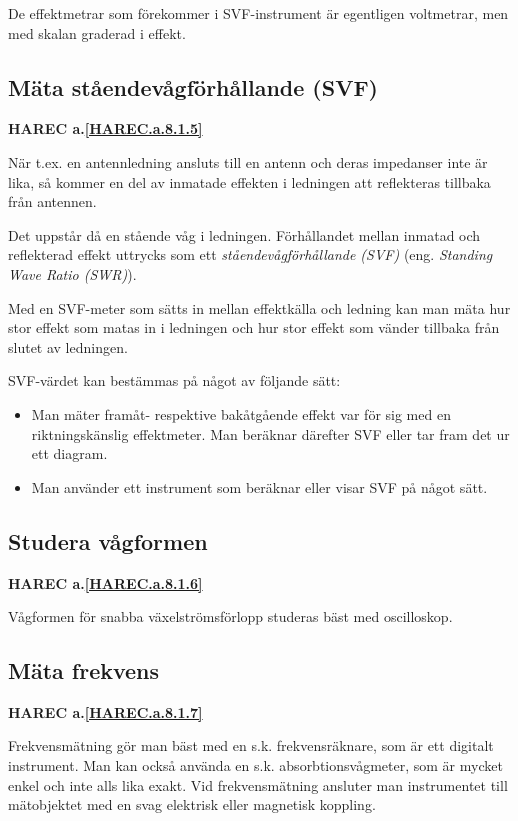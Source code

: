 De effektmetrar som förekommer i SVF-instrument är egentligen voltmetrar,
men med skalan graderad i effekt.

\subsection{Mäta ståendevågförhållande (SVF)}
\textbf{
HAREC a.\ref{HAREC.a.8.1.5}\label{myHAREC.a.8.1.5}
}
\label{mäta ståendevåg}
\label{ståendevågförhållande (SVF)}
\label{Standing Wave Ratio (SWR)}

När t.ex. en antennledning ansluts till en antenn och deras impedanser
inte är lika, så kommer en del av inmatade effekten i ledningen att
reflekteras tillbaka från antennen.

Det uppstår då en stående våg i ledningen. Förhållandet mellan inmatad
och reflekterad effekt uttrycks som ett \emph{ståendevågförhållande (SVF)}
(eng. \emph{Standing Wave Ratio (SWR)}).

Med en SVF-meter som sätts in mellan effektkälla och ledning kan man
mäta hur stor effekt som matas in i ledningen och hur stor effekt som
vänder tillbaka från slutet av ledningen.

SVF-värdet kan bestämmas på något av följande sätt:
\begin{itemize}
\item Man mäter framåt- respektive bakåtgående effekt var för sig med
  en riktningskänslig effektmeter.
  Man beräknar därefter SVF eller tar fram det ur ett diagram.
\item Man använder ett instrument som beräknar eller visar SVF på något sätt.
\end{itemize}

\subsection{Studera vågformen}
\textbf{
HAREC a.\ref{HAREC.a.8.1.6}\label{myHAREC.a.8.1.6}
}

Vågformen för snabba växelströmsförlopp studeras bäst med oscilloskop.

\subsection{Mäta frekvens}
\textbf{
HAREC a.\ref{HAREC.a.8.1.7}\label{myHAREC.a.8.1.7}
}

Frekvensmätning gör man bäst med en s.k. frekvensräknare, som är ett
digitalt instrument.
Man kan också använda en s.k. absorbtionsvågmeter, som är mycket enkel och
inte alls lika exakt.
Vid frekvensmätning ansluter man instrumentet till mätobjektet med en
svag elektrisk eller magnetisk koppling.

